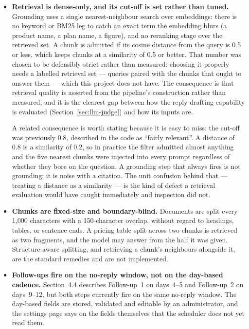 \documentclass[a4paper]{article}
\begin{document}
\begin{itemize}
  \item \textbf{Retrieval is dense-only, and its cut-off is set rather than
    tuned.} Grounding uses a single nearest-neighbour search over embeddings:
    there is no keyword or BM25 leg to catch an exact term the embedding blurs
    (a product name, a plan name, a figure), and no reranking stage over the
    retrieved set. A chunk is admitted if its cosine distance from the query is
    0.5 or less, which keeps chunks at a similarity of 0.5 or better. That
    number was chosen to be defensibly strict rather than measured: choosing it
    properly needs a labelled retrieval set --- queries paired with the chunks
    that ought to answer them --- which this project does not have. The
    consequence is that retrieval quality is asserted from the pipeline's
    construction rather than measured, and it is the clearest gap between how
    the reply-drafting capability is evaluated (Section~\ref{sec:llm-judge})
    and how its inputs are.

    A related consequence is worth stating because it is easy to miss: the
    cut-off was previously 0.8, described in the code as ``fairly relevant''.
    A distance of 0.8 is a similarity of 0.2, so in practice the filter
    admitted almost anything and the five nearest chunks were injected into
    every prompt regardless of whether they bore on the question. A grounding
    step that always fires is not grounding; it is noise with a citation. The
    unit confusion behind that --- treating a distance as a similarity --- is
    the kind of defect a retrieval evaluation would have caught immediately
    and inspection did not.

  \item \textbf{Chunks are fixed-size and boundary-blind.} Documents are split
    every 1,000 characters with a 150-character overlap, without regard to
    headings, tables, or sentence ends. A pricing table split across two chunks
    is retrieved as two fragments, and the model may answer from the half it
    was given. Structure-aware splitting, and retrieving a chunk's neighbours
    alongside it, are the standard remedies and are not implemented.

  \item \textbf{Follow-ups fire on the no-reply window, not on the
    day-based cadence.} Section~4.4 describes Follow-up~1 on days~4--5
    and Follow-up~2 on days~9--12, but both steps currently fire on the
    same no-reply window. The day-based fields are stored, validated and
    editable by an administrator, and the settings page says on the fields
    themselves that the scheduler does not yet read them.


\end{itemize}
\end{document}
